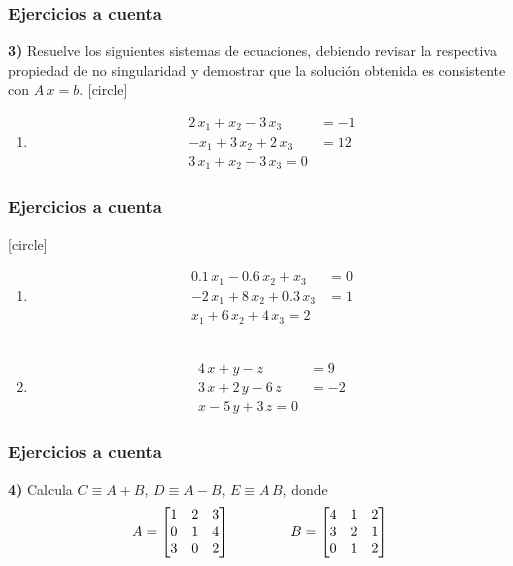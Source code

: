 \begin{frame}
\frametitle{Ejercicios a cuenta}
\textbf{3) } Resuelve los siguientes sistemas de ecuaciones, debiendo revisar la respectiva propiedad de no singularidad y demostrar que la solución obtenida es consistente con $A \, x =  b$.
[circle]
\begin{enumerate}[<+->]
\item \begin{align*}
2 \, x_{1} + x_{2} - 3 \, x_{3} &= -1 \\
-x_{1} + 3 \, x_{2} + 2 \, x_{3} &= 12 \\
3 \, x_{1} + x_{2} - 3 \, x_{3} = 0
\end{align*}
\seti
\end{enumerate}
\end{frame}
\begin{frame}
\frametitle{Ejercicios a cuenta}
[circle]
\begin{enumerate}[<+->]
\conti
\item \begin{align*}
0.1 \, x_{1} - 0.6 \, x_{2} + x_{3} &= 0 \\
-2 \, x_{1} + 8 \, x_{2} + 0.3 \, x_{3} &= 1 \\
x_{1} + 6 \, x_{2} + 4 \, x_{3} = 2
\end{align*}
\\
\bigskip
\item \begin{align*}
4 \, x + y - z &= 9 \\
3 \, x + 2 \, y - 6 \, z &= -2 \\
x - 5 \, y + 3 \, z = 0
\end{align*}
\end{enumerate}
\end{frame}
\begin{frame}
\frametitle{Ejercicios a cuenta}
\textbf{4) } Calcula $C \equiv A + B$, $D \equiv A - B$, $E \equiv A \, B$, donde
\begin{align*}
A = \begin{bmatrix}
1 & 2 & 3 \\
0 & 1 & 4 \\
3 & 0 & 2
\end{bmatrix}
\hspace{1.5cm}
B = \begin{bmatrix}
4 & 1 & 2 \\
3 & 2 & 1 \\
0 & 1 & 2
\end{bmatrix}
\end{align*}
\end{frame}
